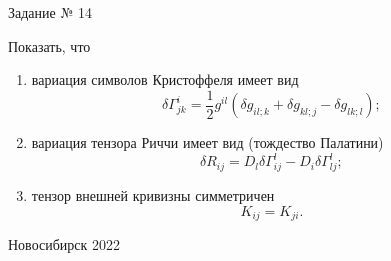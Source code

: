 \documentclass[12pt,pagesize,paper=192mm:108mm,landscape]{scrbook}
\begin{document}
\begin{titlepage}
  \vspace*{-0.5em}
  \begin{center}    




    \vfill
    \Large
    Задание № 14
 \bigskip

    \normalsize
    \begin{minipage}{0.75\linewidth}
  Показать, что
  \begin{enumerate}
   \item вариация символов Кристоффеля имеет вид
    \[\delta\Gamma^{i}_{jk} =\frac{1}{2}g^{il}\left(\delta g_{il;k} +
      \delta g_{kl;j} - \delta g_{lk;l}\right);\]
\item вариация тензора Риччи имеет вид (тождество Палатини)
  \[\delta R_{ij} =    D_l\delta\Gamma^l_{ij} - D_i\delta\Gamma^l_{lj} ;\]
  \item тензор внешней кривизны симметричен \[K_{ij} = K_{ji}.\]
  \end{enumerate}
    \end{minipage}
    \vfill

     \normalsize \ccbysa\hspace{0.5em}  Новосибирск 2022
  \end{center}
\end{titlepage}
\end{document}
